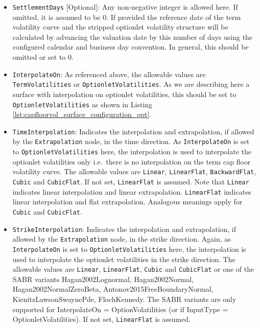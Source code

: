 \begin{itemize}
\item \lstinline!SettlementDays! [Optional]:
Any non-negative integer is allowed here. If omitted, it is assumed to be 0. If provided the reference date of the term volatility curve and the stripped optionlet volatility structure will be calculated by advancing the valuation date by this number of days using the configured calendar and business day convention. In general, this should be omitted or set to 0.

\item \lstinline!InterpolateOn!:
As referenced above, the allowable values are \lstinline!TermVolatilities! or \lstinline!OptionletVolatilities!. As we are describing here a surface with interpolation on optionlet volatilities, this should be set to \lstinline!OptionletVolatilities! as shown in Listing \ref{lst:capfloorvol_surface_configuration_opt}.

\item \lstinline!TimeInterpolation!:
Indicates the interpolation and extrapolation, if allowed by the \lstinline!Extrapolation! node, in the time
direction. As \lstinline!InterpolateOn! is set to \lstinline!OptionletVolatilities! here, the interpolation is used to
interpolate the optionlet volatilities only i.e.\ there is no interpolation on the term cap floor volatility curve. The
allowable values are \lstinline!Linear!, \lstinline!LinearFlat!, \lstinline!BackwardFlat!, \lstinline!Cubic!
and \lstinline!CubicFlat!. If not set, \lstinline!LinearFlat! is assumed. Note that \lstinline!Linear! indicates linear
interpolation and linear extrapolation. \lstinline!LinearFlat! indicates linear interpolation and flat
extrapolation. Analogous meanings apply for \lstinline!Cubic! and \lstinline!CubicFlat!.

\item \lstinline!StrikeInterpolation!:
Indicates the interpolation and extrapolation, if allowed by the \lstinline!Extrapolation! node, in the strike direction. Again, as \lstinline!InterpolateOn! is set to \lstinline!OptionletVolatilities! here, the interpolation is used to interpolate the optionlet volatilities in the strike direction. The allowable values are \lstinline!Linear!, \lstinline!LinearFlat!, \lstinline!Cubic! and \lstinline!CubicFlat! or one of the SABR variants Hagan2002Lognormal, Hagan2002Normal, Hagan2002NormalZeroBeta, Antonov2015FreeBoundaryNormal, KienitzLawsonSwaynePde, FlochKennedy. The SABR variants are only supported for InterpolateOn = OptionVolatilities (or if InputType = OptionletVolatilities). If not set, \lstinline!LinearFlat! is assumed.


\end{itemize}
